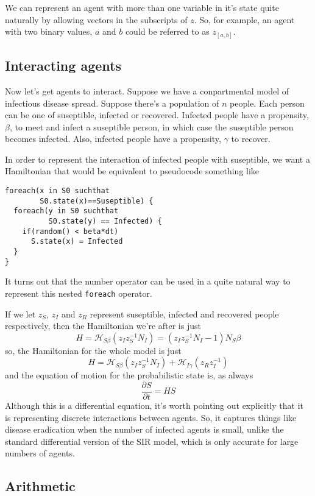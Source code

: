 \documentclass[letterpaper,twocolumn,10pt]{article}
\begin{document}
We can represent an agent with more than one variable in it's state quite naturally by allowing vectors in the subscripts of $z$. So, for example, an agent with two binary values, $a$ and $b$ could be referred to as $z_{[a,b]}$.

\subsection{Interacting agents}

Now let's get agents to interact. Suppose we have a conpartmental model of infectious disease spread. Suppose there's a population of $n$ people. Each person can be one of suseptible, infected or recovered. Infected people have a propensity, $\beta$, to meet and infect a suseptible person, in which case the suseptible person becomes infected. Also, infected people have a propensity, $\gamma$ to recover.

In order to represent the interaction of infected people with suseptible, we want a Hamiltonian that would be equivalent to pseudocode something like
\begin{verbatim}
foreach(x in S0 suchthat 
        S0.state(x)==Suseptible) {
  foreach(y in S0 suchthat
          S0.state(y) == Infected) {
    if(random() < beta*dt)
      S.state(x) = Infected
  }
}
\end{verbatim}

It turns out that the number operator can be used in a quite natural way to represent this nested \texttt{foreach} operator.

If we let $z_S$, $z_I$ and $z_R$ represent suseptible, infected and recovered people respectively, then the Hamiltonian we're after is just
\[
H = \mathcal{H}_{S\beta}(z_Iz_S^{-1}N_I) = (z_Iz_S^{-1}N_I - 1)N_S\beta
\]
so, the Hamiltonian for the whole model is just
\[
H = \mathcal{H}_{S\beta}(z_Iz_S^{-1}N_I) + \mathcal{H}_{I\gamma}(z_Rz_I^{-1})
\]
and the equation of motion for the probabilistic state is, as always
\[
\frac{\partial S}{\partial t} = HS
\]
Although this is a differential equation, it's worth pointing out explicitly that it is representing discrete interactions between agents. So, it captures things like disease eradication when the number of infected agents is small, unlike the standard differential version of the SIR model, which is only accurate for large numbers of agents.

\subsection{Arithmetic}
\end{document}
